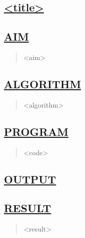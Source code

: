 \newpage
\begin{center}
\section*{\LARGE \textbf{\underline{<title>}}} %
\end{center}

\subsection*{\underline{AIM}}
\begin{quote}
<aim>
\end{quote}

\subsection*{\underline{ALGORITHM}}
\begin{quote}
<algorithm>
\end{quote}

\subsection*{\underline{PROGRAM}}
\begin{quote}
<code>
\end{quote}


\subsection*{\underline{OUTPUT}}

\begin{figure}[H] 
    \centering
\end{figure}


\subsection*{\underline{RESULT}}
\begin{quote}
<result>
\end{quote}


